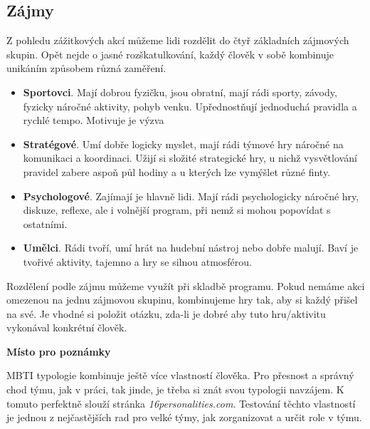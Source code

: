 \documentclass[a4paper,12pt,final]{report}
\begin{document}
\subsection*{Zájmy}
\pagelogos
Z pohledu zážitkových akcí můžeme lidi rozdělit do čtyř základních zájmových skupin. Opět nejde o jasné rozškatulkování, každý člověk v sobě kombinuje unikáním způsobem různá zaměření.

\begin{itemize}
 \item \textbf{Sportovci}. Mají dobrou fyzičku, jsou obratní, mají rádi sporty, závody, fyzicky náročné aktivity, pohyb venku. Upřednostňují jednoduchá pravidla a rychlé tempo. Motivuje je výzva
 
 \item \textbf{Stratégové}. Umí dobře logicky myslet, mají rádi týmové hry náročné na komunikaci a koordinaci. Užijí si složité strategické hry, u nichž vysvětlování pravidel zabere aspoň půl hodiny a u kterých lze vymýšlet různé finty.
 
 \item \textbf{Psychologové}. Zajímají je hlavně lidi. Mají rádi psychologicky náročné hry, diskuze, reflexe, ale i volnější program, při nemž si mohou popovídat s ostatními.
 
 \item \textbf{Umělci}. Rádi tvoří, umí hrát na hudební nástroj nebo dobře malují. Baví je tvořivé aktivity, tajemno a hry se silnou atmosférou.
\end{itemize}

Rozdělení podle zájmu můžeme využít při skladbě programu. Pokud nemáme akci omezenou  na jednu zájmovou skupinu, kombinujeme hry tak, aby si každý přišel na své. Je vhodné si položit otázku, zda-li je dobré aby tuto hru/aktivitu vykonával konkrétní člověk.

\begin{samepage}\begin{flushleft}
\end{flushleft}
\textbf{Místo pro poznámky}
\vspace{3cm}\pagelogos
\end{samepage}

MBTI typologie kombinuje ještě více vlastností člověka. Pro přesnost a správný chod týmu, jak v práci, tak jinde, je třeba si znát svou typologii navzájem. K tomuto perfektně slouží stránka \textit{16personalities.com}. Testování těchto vlastností je jednou z nejčastějších rad pro velké týmy, jak zorganizovat a určit role v týmu.
\end{document}
